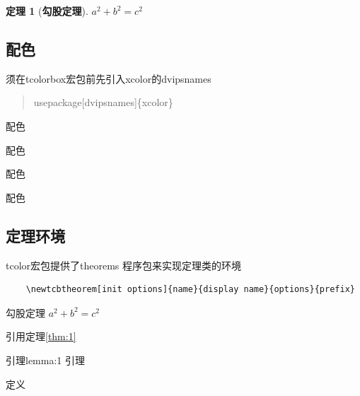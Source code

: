 \documentclass[UTF8,a4paper,8pt,no-math]{article} %
\newtheorem{thm}{定理}[section]%
\numberwithin{equation}{section} %
\begin{document}
\begin{tcolorbox}
	\begin{thm}[\textbf{勾股定理}]
		$a^2+b^2=c^2$
	\end{thm}
\end{tcolorbox}

\subsection{配色}
须在tcolorbox宏包前先引入xcolor的dvipsnames
\begin{quote}
	usepackage[dvipsnames]\{xcolor\}
\end{quote}
\begin{tcolorbox}[colback=Emerald!10,colframe=cyan!40!black,title=\textbf{配色1}]
	配色
\end{tcolorbox}

\begin{tcolorbox}[colback=JungleGreen!10!Cerulean!15,colframe=CornflowerBlue!60!Black,title=\textbf{配色2}]
	配色
\end{tcolorbox}

\begin{tcolorbox}[title=\textbf{配色3},colback=SeaGreen!10!CornflowerBlue!10,colframe=RoyalPurple!55!Aquamarine!100!]
	配色
\end{tcolorbox}

\begin{tcolorbox}[title=\textbf{配色4}, colback=Salmon!20, colframe=Salmon!90!Black]
	配色
\end{tcolorbox}

\subsection{定理环境}
tcolor宏包提供了theorems 程序包来实现定理类的环境

\begin{lstlisting}
	\newtcbtheorem[init options]{name}{display name}{options}{prefix}
\end{lstlisting}

\begin{mytheo}{勾股定理}{}\label{thm:1}
	$a^2+b^2=c^2$
\end{mytheo}
引用定理\ref{thm:1}

\begin{mylemma}{引理}{lemma:1}
	引理
\end{mylemma}
\begin{mydef}{}{}
	定义
\end{mydef}
\end{document}

